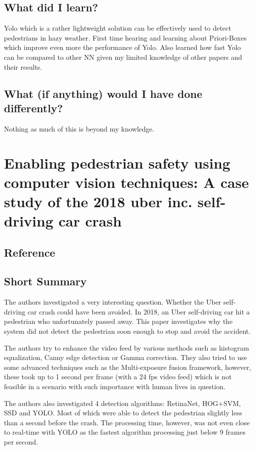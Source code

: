 \documentclass[11pt,a4paper]{article}
\begin{document}
\subsection*{What did I learn?}
Yolo which is a rather lightweight solution can be effectively used to detect pedestrians in hazy weather. First time hearing and learning about Priori-Boxes which improve even more the performance of Yolo. Also learned how fast Yolo can be compared to other NN given my limited knowledge of other papers and their results.

\subsection*{What (if anything) would I have done differently?}
Nothing as much of this is beyond my knowledge.
\newpage 


\section*{Enabling pedestrian safety using computer vision techniques: A case study of the 2018 uber inc. self-driving car crash}
\subsection*{Reference}

\subsection*{Short Summary} 
The authors investigated a very interesting question. Whether the Uber self-driving car crash could have been avoided. In 2018, an Uber self-driving car hit a pedestrian who unfortunately passed away. This paper investigates why the system did not detect the pedestrian soon enough to stop and avoid the accident.

The authors try to enhance the video feed by various methods such as histogram equalization, Canny edge detection or Gamma correction. They also tried to use some advanced techniques such as the Multi-exposure fusion framework, however, these took up to 1 second per frame (with a 24 fps video feed) which is not feasible in a scenario with such importance with human lives in question.

The authors also investigated 4 detection algorithms: RetinaNet, HOG+SVM, SSD and YOLO. Most of which were able to detect the pedestrian slightly less than a second before the crash. The processing time, however, was not even close to real-time with YOLO as the fastest algorithm processing just below 9 frames per second.
\end{document}
